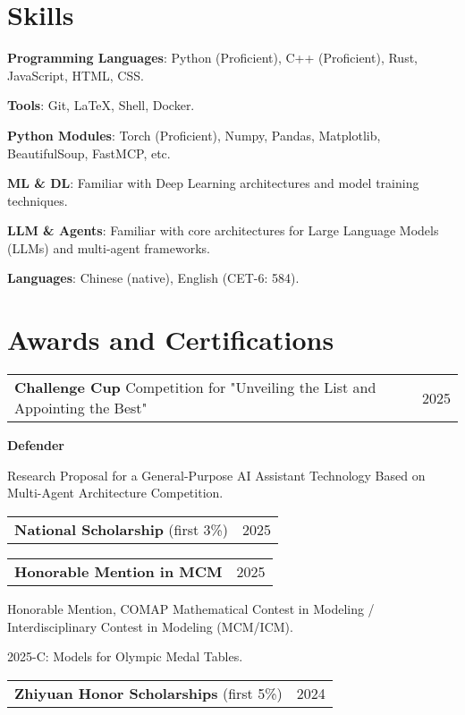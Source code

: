 \documentclass[letterpaper,11pt]{article}
\makeatletter
\newcommand{\twopartheader}[2]{
  \vspace{-2pt}\noindent
  \begin{tabular*}{\textwidth}{l@{\extracolsep{\fill}}r}
    #1 & #2 \\
  \end{tabular*}\vspace{-7pt}
}
\makeatother
\begin{document}
\section{Skills}
\textbf{Programming Languages}: Python (Proficient), C++ (Proficient), Rust, JavaScript, HTML, CSS.

\textbf{Tools}: Git, LaTeX, Shell, Docker.

\textbf{Python Modules}: Torch (Proficient), Numpy, Pandas, Matplotlib, BeautifulSoup, FastMCP, etc.

\textbf{ML \& DL}: Familiar with Deep Learning architectures and model training techniques.

\textbf{LLM \& Agents}: Familiar with core architectures for Large Language Models (LLMs) and multi-agent frameworks. 

\textbf{Languages}: Chinese (native), English (CET-6: 584).




\section{Awards and Certifications}

\twopartheader{\textbf{Challenge Cup} Competition for "Unveiling the List and Appointing the Best"}{2025}

\textbf{Defender}

Research Proposal for a General-Purpose AI Assistant Technology Based on Multi-Agent Architecture Competition.
\newline

\twopartheader{\textbf{National Scholarship} (first 3\%)}{2025}
\newline

\twopartheader{\textbf{Honorable Mention in MCM}}{2025}

Honorable Mention, COMAP Mathematical Contest in Modeling / Interdisciplinary Contest in Modeling (MCM/ICM).

2025-C: Models for Olympic Medal Tables.
\newline

\twopartheader{\textbf{Zhiyuan Honor Scholarships} (first 5\%)}{2024}
\end{document}
